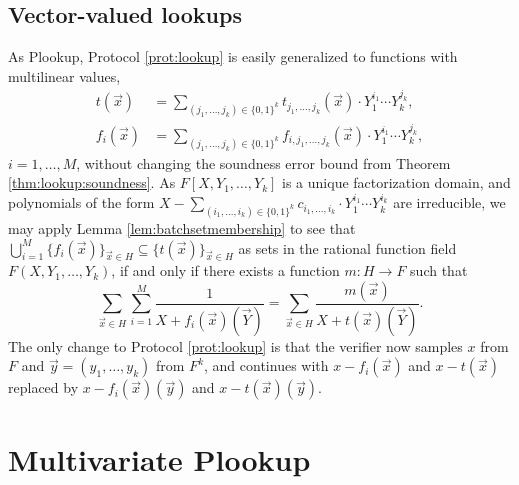 \documentclass[11pt]{article}
\theoremstyle{definition}
\theoremstyle{definition}
\begin{document}
\subsection{Vector-valued lookups}
\label{s:pa:Generalizations}

As Plookup, Protocol \ref{prot:lookup} is easily generalized to functions with multilinear values, 
\begin{align*}
t(\vec x) &= \sum_{(j_1,\ldots, j_k)\in\{0,1\}^k} t_{j_1,\ldots, j_k}(\vec x)\cdot Y_1^{i_1}\cdots Y_k^{j_k},
\\
f_i(\vec x) &= \sum_{(j_1,\ldots, j_k)\in\{0,1\}^k} f_{i, j_1,\ldots, j_k}(\vec x)\cdot Y_1^{i_1}\cdots Y_k^{j_k},
\end{align*}
$i=1,\ldots, M$, without changing the soundness error bound from Theorem \ref{thm:lookup:soundness}.
As $F[X, Y_1,\ldots, Y_k]$ is a unique factorization domain, and polynomials of the form $X -  \sum_{(i_1,\ldots, i_k)\in\{0,1\}^k} c_{i_1,\ldots, i_k}\cdot Y_1^{i_1}\cdots Y_k^{i_k}$ are irreducible, we may apply Lemma \ref{lem:batchsetmembership} to see that $\bigcup_{i=1}^M \{f_i(\vec x)\}_{\vec x\in H}\subseteq \{t(\vec x)\}_{\vec x\in H}$ as sets in the rational function field $F(X, Y_1,\ldots, Y_k)$, if and only if there exists a function $m: H\rightarrow F$ such that
\begin{equation*}
\sum_{\vec x\in H} \sum_{i=1}^M \frac{1}{X + f_i(\vec x)(\vec Y)} = \sum_{\vec x\in H} \frac{m(\vec x)}{X + t(\vec x)(\vec Y)}.
\end{equation*}
The only change to Protocol \ref{prot:lookup} is that the verifier now samples $x$ from $F$ and $\vec y = (y_1,\ldots, y_k)$ from $F^k$, and continues with $x - f_i(\vec x)$ and $x - t(\vec x)$ replaced by $x - f_i(\vec x)(\vec y)$ and $x - t(\vec x)(\vec y)$.


\newpage
\section{Multivariate Plookup}
\label{s:hyperplonk}
\end{document}
